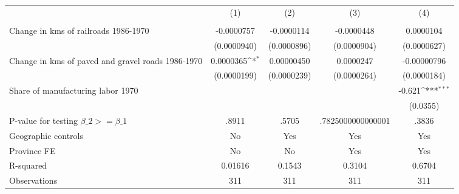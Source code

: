 {
\def\sym#1{\ifmmode^{#1}\else\(^{#1}\)\fi}
\begin{tabular}{l*{4}{c}}
\hline\hline
                &\multicolumn{1}{c}{(1)}&\multicolumn{1}{c}{(2)}&\multicolumn{1}{c}{(3)}&\multicolumn{1}{c}{(4)}\\
                &\multicolumn{1}{c}{}&\multicolumn{1}{c}{}&\multicolumn{1}{c}{}&\multicolumn{1}{c}{}\\
\hline
Change in kms of railroads 1986-1970&-0.0000757         &-0.0000114         &-0.0000448         &0.0000104         \\
                &(0.0000940)         &(0.0000896)         &(0.0000904)         &(0.0000627)         \\
[1em]
Change in kms of paved and gravel roads 1986-1970&0.0000365\sym{*}  &0.00000450         &0.0000247         &-0.00000796         \\
                &(0.0000199)         &(0.0000239)         &(0.0000264)         &(0.0000184)         \\
[1em]
Share of manufacturing labor 1970&                  &                  &                  &   -0.621\sym{***}\\
                &                  &                  &                  & (0.0355)         \\
\hline
P-value for testing $\beta\_{2} >= \beta\_{1}$&    .8911         &    .5705         &.7825000000000001         &    .3836         \\
Geographic controls&       No         &      Yes         &      Yes         &      Yes         \\
Province FE     &       No         &       No         &      Yes         &      Yes         \\
R-squared       &  0.01616         &   0.1543         &   0.3104         &   0.6704         \\
Observations    &      311         &      311         &      311         &      311         \\
\hline\hline
\end{tabular}
}
